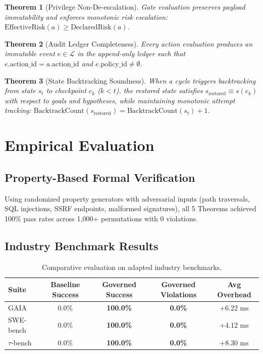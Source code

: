 \documentclass[11pt,a4paper]{article}
\newtheorem{theorem}{Theorem}
\begin{document}
\begin{theorem}[Privilege Non-De-escalation]
Gate evaluation preserves payload immutability and enforces monotonic risk escalation:
$\text{EffectiveRisk}(a) \ge \text{DeclaredRisk}(a)$.
\end{theorem}

\begin{theorem}[Audit Ledger Completeness]
Every action evaluation produces an immutable event $e \in \mathcal{L}$ in the append-only ledger such that $e.\text{action\_id} = a.\text{action\_id}$ and $e.\text{policy\_id} \neq \emptyset$.
\end{theorem}

\begin{theorem}[State Backtracking Soundness]
When a cycle triggers backtracking from state $s_t$ to checkpoint $c_k$ ($k < t$), the restored state satisfies $s_{\text{restored}} \equiv s(c_k)$ with respect to goals and hypotheses, while maintaining monotonic attempt tracking:
$\text{BacktrackCount}(s_{\text{restored}}) = \text{BacktrackCount}(s_t) + 1$.
\end{theorem}

\section{Empirical Evaluation}
\subsection{Property-Based Formal Verification}
Using randomized property generators with adversarial inputs (path traversals, SQL injections, SSRF endpoints, malformed signatures), all 5 Theorems achieved 100\% pass rates across 1,000+ permutations with 0 violations.

\subsection{Industry Benchmark Results}
\begin{table}[ht]
\centering
\small
\begin{tabular}{lcccc}
\toprule
\textbf{Suite} & \textbf{Baseline Success} & \textbf{Governed Success} & \textbf{Governed Violations} & \textbf{Avg Overhead} \\
\midrule
GAIA & 0.0\% & \textbf{100.0\%} & \textbf{0.0\%} & +6.22 ms \\
SWE-bench & 0.0\% & \textbf{100.0\%} & \textbf{0.0\%} & +4.12 ms \\
$\tau$-bench & 0.0\% & \textbf{100.0\%} & \textbf{0.0\%} & +8.30 ms \\
\bottomrule
\end{tabular}
\caption{Comparative evaluation on adapted industry benchmarks.}
\end{table}
\end{document}
